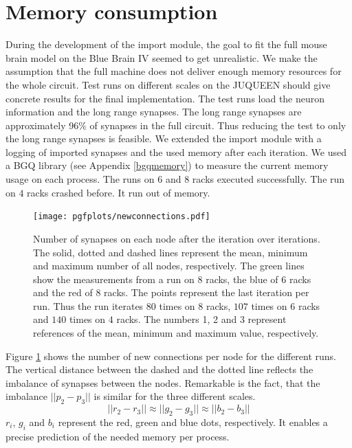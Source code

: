\section{Memory consumption}
During the development of the import module, the goal to fit the full mouse brain model on the
Blue Brain IV seemed to get unrealistic. We make the assumption that the full machine does not deliver enough memory resources for the whole circuit.
Test runs on different scales on the JUQUEEN should give concrete results for the final implementation.
The test runs load the neuron information and the long range synapses.
The long range synapses are approximately 96\% of synapses in the full circuit.
Thus reducing the test to only the long range synapses is feasible.
We extended the import module with a logging of imported synapses and the used memory after each iteration.
We used a BGQ library (see Appendix \ref{bgqmemory}) to measure the current memory usage on each process.
The runs on $6$ and $8$ racks executed successfully.
The run on $4$ racks crashed before.
It run out of memory.
\begin{figure}[h!]
\begin{center}
 \texttt{[image: pgfplots/newconnections.pdf]}
\end{center}
\caption{Number of synapses on each node after the iteration over iterations.
The solid, dotted and dashed lines represent the mean, minimum and maximum number of all nodes, respectively.
The green lines show the measurements from a run on 8 racks, the blue of 6 racks and the red of 8 racks.
The points represent the last iteration per run.
Thus the run iterates $80$ times on $8$ racks, $107$ times on $6$ racks and $140$ times on $4$ racks.
The numbers 1, 2 and 3 represent references of the mean, minimum and maximum value, respectively.
 }
\label{fig:newconnections}
\end{figure}
Figure \ref{fig:newconnections} shows the number of new connections per node for the different runs.
The vertical distance between the dashed and the dotted line reflects the imbalance of synapses between the nodes.
Remarkable is the fact, that the imbalance $||p_2-p_3||$ is similar for the three different scales.
\begin{equation}
	||r_2-r_3|| \approx ||g_2-g_3|| \approx ||b_2-b_3||
\end{equation}
$r_i$, $g_i$ and $b_i$ represent the red, green and blue dots, respectively.
It enables a precise prediction of the needed memory per process.

